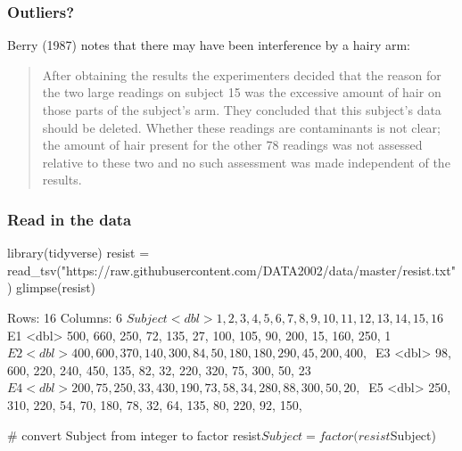 \documentclass[a4paper]{article}
\begin{document}
\subsubsection{Outliers?}
Berry (1987) notes that there may have been interference by a hairy arm:
\begin{tcolorbox}[bluestyleline]
	\blockquote{After obtaining the results the experimenters decided that the reason for the two large readings on subject 15 was the excessive amount of hair on those parts of the subject's arm. They concluded that this subject's data should be deleted. Whether these readings are contaminants is not clear; the amount of hair present for the other 78 readings was not assessed relative to these two and no such assessment was made independent of the results.}
\end{tcolorbox}
\subsubsection{Read in the data}
\begin{Schunk}
\begin{Sinput}
library(tidyverse)
resist = read_tsv("https://raw.githubusercontent.com/DATA2002/data/master/resist.txt")
glimpse(resist)
\end{Sinput}
\begin{Soutput}
Rows: 16
Columns: 6
$ Subject <dbl> 1, 2, 3, 4, 5, 6, 7, 8, 9, 10, 11, 12, 13, 14, 15, 16
$ E1      <dbl> 500, 660, 250, 72, 135, 27, 100, 105, 90, 200, 15, 160, 250, 1~
$ E2      <dbl> 400, 600, 370, 140, 300, 84, 50, 180, 180, 290, 45, 200, 400, ~
$ E3      <dbl> 98, 600, 220, 240, 450, 135, 82, 32, 220, 320, 75, 300, 50, 23~
$ E4      <dbl> 200, 75, 250, 33, 430, 190, 73, 58, 34, 280, 88, 300, 50, 20, ~
$ E5      <dbl> 250, 310, 220, 54, 70, 180, 78, 32, 64, 135, 80, 220, 92, 150,~
\end{Soutput}
\begin{Sinput}
# convert Subject from integer to factor
resist$Subject = factor(resist$Subject) 
\end{Sinput}
\end{Schunk}
\end{document}
